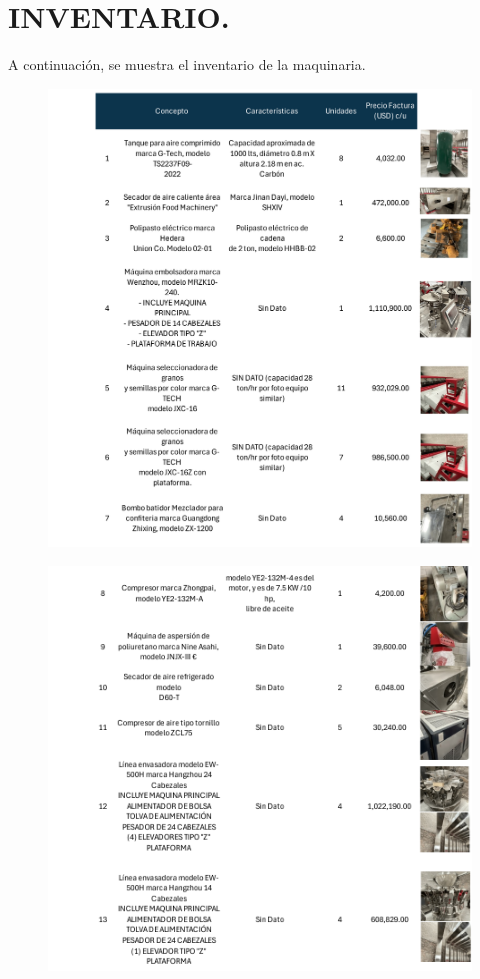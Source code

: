 \chapter{INVENTARIO.} %

A continuación, se muestra el inventario de la maquinaria.

\begin{figure}[hbtp!]
	\centering
	\includegraphics[width= 0.8 \linewidth, page = 1]{../0.imagenes/CAP_5/inv_1}
\end{figure}
\newpage
\begin{figure}[hbtp!]
	\centering
	\includegraphics[width= 0.8 \linewidth, page = 1]{../0.imagenes/CAP_5/inv_2}
\end{figure}
\espacio
